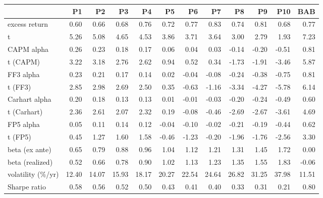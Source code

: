\begin{tabular}{lrrrrrrrrrrr}
\toprule
 & P1 & P2 & P3 & P4 & P5 & P6 & P7 & P8 & P9 & P10 & BAB \\
\midrule
excess return & 0.60 & 0.66 & 0.68 & 0.76 & 0.72 & 0.77 & 0.83 & 0.74 & 0.81 & 0.68 & 0.77 \\
  t & 5.26 & 5.08 & 4.65 & 4.53 & 3.86 & 3.71 & 3.64 & 3.00 & 2.79 & 1.93 & 7.23 \\
CAPM alpha & 0.26 & 0.23 & 0.18 & 0.17 & 0.06 & 0.04 & 0.03 & -0.14 & -0.20 & -0.51 & 0.81 \\
  t (CAPM) & 3.22 & 3.18 & 2.76 & 2.62 & 0.94 & 0.52 & 0.34 & -1.73 & -1.91 & -3.46 & 5.87 \\
FF3 alpha & 0.23 & 0.21 & 0.17 & 0.14 & 0.02 & -0.04 & -0.08 & -0.24 & -0.38 & -0.75 & 0.81 \\
  t (FF3) & 2.85 & 2.98 & 2.69 & 2.50 & 0.35 & -0.63 & -1.16 & -3.34 & -4.27 & -5.78 & 6.14 \\
Carhart alpha & 0.20 & 0.18 & 0.13 & 0.13 & 0.01 & -0.01 & -0.03 & -0.20 & -0.24 & -0.49 & 0.60 \\
  t (Carhart) & 2.36 & 2.61 & 2.07 & 2.32 & 0.19 & -0.08 & -0.46 & -2.69 & -2.67 & -3.61 & 4.69 \\
FP5 alpha & 0.05 & 0.11 & 0.14 & 0.12 & -0.04 & -0.10 & -0.02 & -0.21 & -0.19 & -0.44 & 0.62 \\
  t (FP5) & 0.45 & 1.27 & 1.60 & 1.58 & -0.46 & -1.23 & -0.20 & -1.96 & -1.76 & -2.56 & 3.30 \\
beta (ex ante) & 0.65 & 0.79 & 0.88 & 0.96 & 1.04 & 1.12 & 1.21 & 1.31 & 1.45 & 1.72 & 0.00 \\
beta (realized) & 0.52 & 0.66 & 0.78 & 0.90 & 1.02 & 1.13 & 1.23 & 1.35 & 1.55 & 1.83 & -0.06 \\
volatility (\%/yr) & 12.40 & 14.07 & 15.93 & 18.17 & 20.27 & 22.54 & 24.64 & 26.82 & 31.25 & 37.98 & 11.51 \\
Sharpe ratio & 0.58 & 0.56 & 0.52 & 0.50 & 0.43 & 0.41 & 0.40 & 0.33 & 0.31 & 0.21 & 0.80 \\
\bottomrule
\end{tabular}
